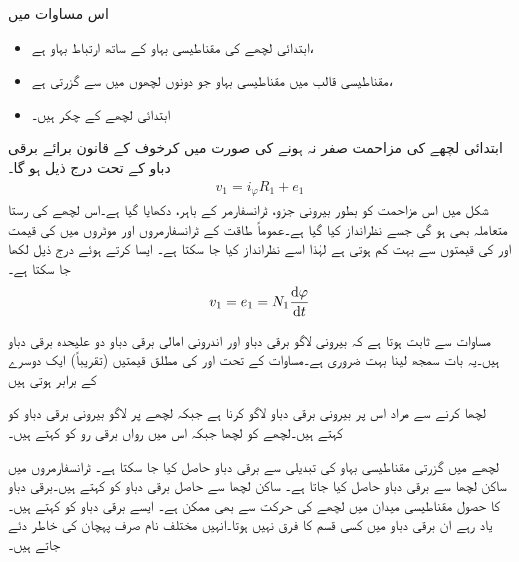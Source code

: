  اس مساوات میں
\begin{itemize}
\item
{} ابتدائی لچھے کی مقناطیسی بہاو کے ساتھ ارتباط بہاو ہے،
\item
{} مقناطیسی قالب میں مقناطیسی بہاو جو دونوں لچھوں میں سے گزرتی ہے،
\item
{} ابتدائی لچھے کے چکر ہیں۔
\end{itemize}
%

ابتدائی لچھے کی مزاحمت  صفر نہ ہونے کی صورت میں کرخوف کے قانون برائے برقی دباو کے تحت درج ذیل ہو گا۔
\begin{align}\label{مساوات_ٹرانسفارمر_بیرونی_اندرونی_دباو_فرق}
v_1 = i_{\varphi} R_1+e_1
\end{align}
شکل  میں اس مزاحمت کو بطور بیرونی جزو، ٹرانسفارمر کے باہر، دکھایا گیا ہے۔اس لچھے کی رستا متعاملہ بھی ہو گی جسے نظرانداز کیا گیا ہے۔عموماً طاقت کے ٹرانسفارمروں اور موٹروں  میں  کی قیمت  اور  کی قیمتوں سے بہت کم ہوتی ہے لہٰذا اسے نظرانداز کیا جا سکتا ہے۔ ایسا کرتے ہوئے درج ذیل لکھا جا سکتا ہے۔
\begin{align}\label{مساوات_ٹرانسفارمر_بیرونی_اندرونی_دباو_تقریبا_برابر}
v_1 = e_1=N_1 \frac{\dif \varphi}{\dif t}
\end{align}

مساوات  سے  ثابت ہوتا ہے کہ بیرونی لاگو برقی دباو  اور اندرونی امالی برقی دباو  دو علیحدہ برقی دباو ہیں۔یہ بات سمجھ لینا بہت ضروری ہے۔مساوات  کے تحت  اور  کی مطلق قیمتیں  (تقریباً) ایک دوسرے کے برابر ہوتی ہیں

لچھا  کرنے سے مراد اس پر بیرونی برقی دباو لاگو کرنا ہے  جبکہ لچھے پر لاگو بیرونی برقی دباو کو   کہتے ہیں۔لچھے  کو  لچھا جبکہ اس میں رواں برقی رو کو  کہتے ہیں۔

لچھے میں گزرتی مقناطیسی بہاو کی تبدیلی سے  برقی دباو حاصل کیا جا سکتا ہے۔ ٹرانسفارمروں میں ساکن لچھا سے برقی دباو حاصل کیا جاتا ہے۔ ساکن لچھا سے حاصل برقی دباو کو   کہتے ہیں۔برقی دباو کا حصول مقناطیسی میدان میں لچھے کی حرکت سے بھی ممکن ہے۔ ایسے برقی دباو کو   کہتے ہیں۔یاد رہے ان برقی دباو میں کسی قسم کا فرق نہیں ہوتا۔انہیں مختلف نام صرف پہچان کی خاطر دئے جاتے ہیں۔

